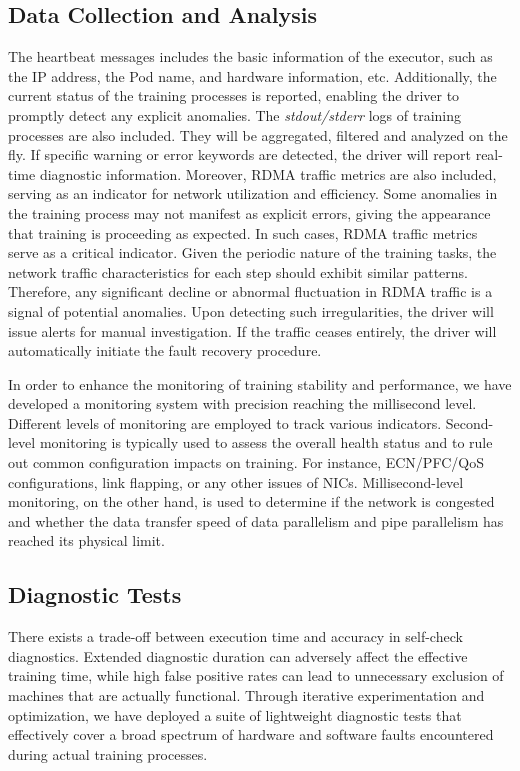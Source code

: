 \documentclass[letterpaper,twocolumn,10pt]{article}
\begin{document}
\subsection{Data Collection and Analysis}
\label{sec:log}

The heartbeat messages includes the basic information of the executor, such as
the IP address, the Pod name, and hardware information, etc. Additionally, the
current status of the training processes is reported, enabling the driver to
promptly detect any explicit anomalies. The \textit{stdout/stderr} logs of
training processes are also included. They will be aggregated, filtered and
analyzed on the fly.
If specific warning or error keywords are detected, the driver
will report real-time diagnostic information. Moreover, RDMA traffic metrics
are also included, serving as an indicator for network utilization and efficiency.
Some anomalies in the training process may not manifest as explicit errors,
giving the appearance that training is proceeding as expected. In such cases,
RDMA traffic metrics serve as a critical indicator. Given the periodic nature of
the training tasks, the network traffic characteristics for each step should
exhibit similar patterns. Therefore, any significant decline or abnormal
fluctuation in RDMA traffic is a signal of potential anomalies. Upon detecting
such irregularities, the driver will issue alerts for manual investigation. If
the traffic ceases entirely, the driver will automatically initiate the fault
recovery procedure. 

In order to enhance the monitoring of training stability and performance, we have developed a monitoring system with precision reaching the millisecond level. Different levels of monitoring are employed to track various indicators. Second-level monitoring is typically used to assess the overall health status and to rule out common configuration impacts on training. For instance, ECN/PFC/QoS configurations, link flapping, or any other issues of NICs. Millisecond-level monitoring, on the other hand, is used to determine if the network is congested and whether the data transfer speed of data parallelism and pipe parallelism has reached its physical limit.

\subsection{Diagnostic Tests}
\label{sec:faults_checker}

There exists a trade-off between execution time and accuracy in self-check
diagnostics. Extended diagnostic duration can adversely affect the effective
training time, while high false positive rates can lead to unnecessary
exclusion of machines that are actually functional. Through iterative
experimentation and optimization, we have deployed a suite of lightweight
diagnostic tests that effectively cover a broad spectrum of hardware and
software faults encountered during actual training processes.
\end{document}
